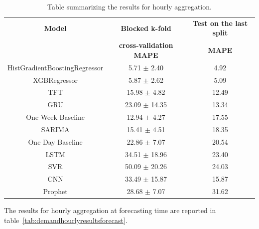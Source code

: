 \begin{table}[H]
\centering
\begin{tabular}{|c|c|c|}
\hline
\textbf{Model} & \textbf{Blocked k-fold} & \textbf{Test on the last split}\\
 & \textbf{cross-validation MAPE} & \textbf{MAPE}\\
\hline
HistGradientBoostingRegressor & 5.71 $\pm$ 2.40 & 4.92\\
\hline
XGBRegressor & 5.87 $\pm$ 2.62 & 5.09\\
\hline
TFT & 15.98 $\pm$ 4.82 & 12.49\\
\hline
GRU & 23.09 $\pm$ 14.35 & 13.34\\
\hline
One Week Baseline & 12.94 $\pm$ 4.27 & 17.55\\
\hline
SARIMA & 15.41 $\pm$ 4.51 & 18.35\\
\hline
One Day Baseline & 22.86 $\pm$ 7.07 & 20.54\\
\hline
LSTM & 34.51 $\pm$ 18.96 & 23.40\\
\hline
SVR & 50.09 $\pm$ 20.26 & 24.03\\
\hline
CNN & 33.49 $\pm$ 15.87 & 15.87\\
\hline
Prophet & 28.68 $\pm$ 7.07 & 31.62\\
\hline
\end{tabular}
\caption{Table summarizing the results for hourly aggregation.}
\label{tab:demandhourlyresults}
\end{table}




The results for hourly aggregation at forecasting time are reported in table~\ref{tab:demandhourlyresultsforecast}.

